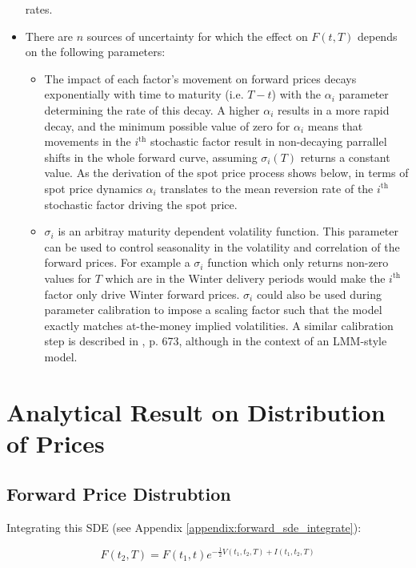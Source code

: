\documentclass{article}
\begin{document}
\begin{itemize}
    rates.
    \item There are $n$ sources of uncertainty for which the effect on $F(t, T)$
    depends on the following parameters:
    \begin{itemize}
        \item The impact of each factor's movement on forward prices decays exponentially
        with time to maturity (i.e. $T-t$) with the $\alpha_i$ parameter determining the
        rate of this decay. A higher $\alpha_i$ results in a more rapid decay, and the minimum
        possible value of zero for $\alpha_i$ means that movements in the $i^\text{th}$ 
        stochastic factor result in 
        non-decaying parrallel shifts in the whole forward curve, assuming $\sigma_i(T)$ 
        returns a constant value. As the derivation of the spot price process shows
        below, in terms of spot price dynamics $\alpha_i$ translates to the mean reversion 
        rate of the $i^\text{th}$ stochastic factor driving the spot price.
        \item $\sigma_i$ is an arbitray maturity dependent volatility function. This parameter
        can be used to control seasonality in the volatility and correlation of the forward
        prices. For example a $\sigma_i$ function which only returns non-zero values for $T$
        which are in the Winter delivery periods would make the $i^\text{th}$ factor only
        drive Winter forward prices. $\sigma_i$ could also be used during parameter calibration
        to impose a scaling factor such that the model exactly matches at-the-money implied
        volatilities. A similar calibration step is described in \cite{Rebonato}, p. 673, 
        although in the context of an LMM-style model.
    \end{itemize}
\end{itemize}

\section{Analytical Result on Distribution of Prices}
\subsection{Forward Price Distrubtion}
Integrating this SDE (see Appendix \ref{appendix:forward_sde_integrate}):

\begin{equation}
    \label{eq:forward_process_integrated}
    F(t_2, T) = F(t_1, t)e^{- \frac{1}{2} V(t_1, t_2, T) + I(t_1, t_2, T)}
\end{equation}
\end{document}
